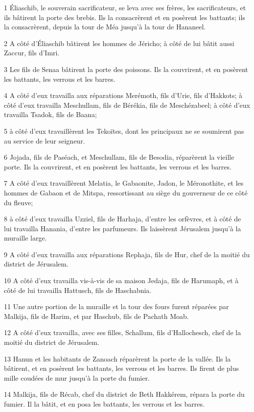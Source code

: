 \par 1 Éliaschib, le souverain sacrificateur, se leva avec ses frères, les sacrificateurs, et ils bâtirent la porte des brebis. Ils la consacrèrent et en posèrent les battants; ils la consacrèrent, depuis la tour de Méa jusqu'à la tour de Hananeel.
\par 2 A côté d'Éliaschib bâtirent les hommes de Jéricho; à côté de lui bâtit aussi Zaccur, fils d'Imri.
\par 3 Les fils de Senaa bâtirent la porte des poissons. Ils la couvrirent, et en posèrent les battants, les verrous et les barres.
\par 4 A côté d'eux travailla aux réparations Merémoth, fils d'Urie, fils d'Hakkots; à côté d'eux travailla Meschullam, fils de Bérékia, fils de Meschézabeel; à côté d'eux travailla Tsadok, fils de Baana;
\par 5 à côté d'eux travaillèrent les Tekoïtes, dont les principaux ne se soumirent pas au service de leur seigneur.
\par 6 Jojada, fils de Paséach, et Meschullam, fils de Besodia, réparèrent la vieille porte. Ils la couvrirent, et en posèrent les battants, les verrous et les barres.
\par 7 A côté d'eux travaillèrent Melatia, le Gabaonite, Jadon, le Méronothite, et les hommes de Gabaon et de Mitspa, ressortissant au siège du gouverneur de ce côté du fleuve;
\par 8 à côté d'eux travailla Uzziel, fils de Harhaja, d'entre les orfèvres, et à côté de lui travailla Hanania, d'entre les parfumeurs. Ils laissèrent Jérusalem jusqu'à la muraille large.
\par 9 A côté d'eux travailla aux réparations Rephaja, fils de Hur, chef de la moitié du district de Jérusalem.
\par 10 A côté d'eux travailla vis-à-vis de sa maison Jedaja, fils de Harumaph, et à côté de lui travailla Hattusch, fils de Haschabnia.
\par 11 Une autre portion de la muraille et la tour des fours furent réparées par Malkija, fils de Harim, et par Haschub, fils de Pachath Moab.
\par 12 A côté d'eux travailla, avec ses filles, Schallum, fils d'Hallochesch, chef de la moitié du district de Jérusalem.
\par 13 Hanun et les habitants de Zanoach réparèrent la porte de la vallée. Ils la bâtirent, et en posèrent les battants, les verrous et les barres. Ils firent de plus mille coudées de mur jusqu'à la porte du fumier.
\par 14 Malkija, fils de Récab, chef du district de Beth Hakkérem, répara la porte du fumier. Il la bâtit, et en posa les battants, les verrous et les barres.
